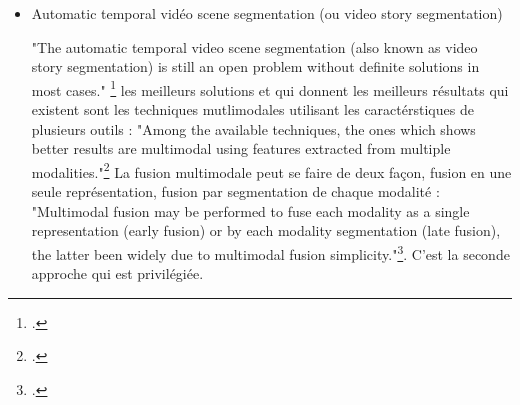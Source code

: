 \begin{itemize}
TDSNet repose sur deux modules : 
TFRM : temporal feature refine model : il extrait les features temporelles par différence entre l'image cible (target frame) et l'image de référence (reference frame). Il utilise ensuite l'information de mouvement retenue pour aligner et fusionner les features de la référence dans l'image cible.\footcite{yuan2025} 

MMRM : Motion magnitude refine module 
les features extraites par le TFRM contiennent des magnitudes de mouvements variés : ""we observe that motion magnitudes in the far frames are not necessarily larger than that of near frames. For example, with repetitive motion of the video, farther frames may exhibit smaller motion magnitudes.". Le MMRM calcule donc le poids adaptatif de chaque feature temporelle selon la magnitude de mouvement réellement observée dans la vidéo en entrée, puis les fusionne.\footcite{yuan2025}

Le modèle est entraîné sur deux jeux de données : VSPW (13 images par secondes et un écart de mean Intersection over Union de 0.7 pourcent)


\subitem CamVid

Cambridge driving : base de données vidéo etiquetée par des classes sémantiques d'objets. \footcite{brostow2009} : 2009 donc trop vieux 
ce qui est intéressant, c'est que en 2009, il y a moins d'algorithmes puissants et précis qui existent, donc c'est la vé

\item Automatic temporal vidéo scene segmentation (ou video story segmentation)

"The automatic temporal video scene segmentation (also known as video story segmentation) is still an open problem without definite solutions in most cases." \footcite{trojahn2021}
les meilleurs solutions et qui donnent les meilleurs résultats qui existent sont les techniques mutlimodales utilisant les caractérstiques de plusieurs outils : "Among the available techniques, the ones which shows better results are multimodal using features extracted from multiple modalities."\footcite{trojahn2021}
La fusion multimodale peut se faire de deux façon, fusion en une seule représentation, fusion par segmentation de chaque modalité : "Multimodal fusion may be performed to fuse each modality as a single representation (early fusion) or by each modality segmentation (late fusion), the latter been widely due to multimodal fusion simplicity."\footcite{trojahn2021}. C'est la seconde approche qui est privilégiée. 


\end{itemize}

